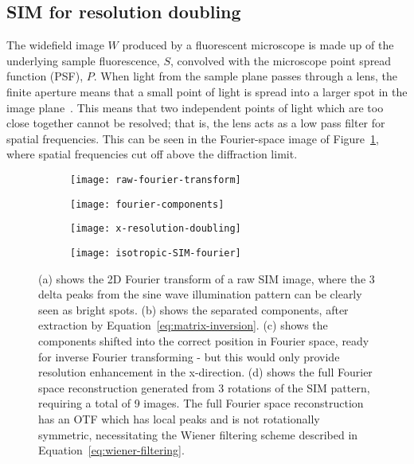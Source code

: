 
\subsection{SIM for resolution doubling} \label{sec:SIM-theory}

The widefield image $W$ produced by a fluorescent microscope is made up of the underlying sample fluorescence, $S$, convolved with the microscope point spread function (PSF), $P$. 
When light from the sample plane passes through a lens, the finite aperture means that a small point of light is spread into a larger spot in the image plane~\cite[\textit{ch. 11}]{hecht2017optics}. 
This means that two independent points of light which are too close together cannot be resolved; that is, the lens acts as a low pass filter for spatial frequencies. 
This can be seen in the Fourier-space image of Figure~\ref{fig:raw-fourier-transform}, where spatial frequencies cut off above the diffraction limit. 

\begin{figure}[p]
\centering
\begin{subfigure}[b]{0.49\textwidth}
	\texttt{[image: raw-fourier-transform]}
	\caption{}\label{fig:raw-fourier-transform}
\end{subfigure}
\hfill
\begin{subfigure}[b]{0.49\textwidth}
	\texttt{[image: fourier-components]}
	\caption{}\label{fig:fourier-components}
\end{subfigure}

\begin{subfigure}[b]{0.49\textwidth}
	\texttt{[image: x-resolution-doubling]}
	\caption{}\label{fig:x-resolution-doubling}
\end{subfigure}
\hfill
\begin{subfigure}[b]{0.49\textwidth}
	\texttt{[image: isotropic-SIM-fourier]}
	\caption{}\label{fig:isotropic-SIM-fourier}
\end{subfigure}
\caption[LAG SIM: Reconstruction of SIM images takes place in Fourier space]{(a) shows the 2D Fourier transform of a raw SIM image, where the 3 delta peaks from the sine wave illumination pattern can be clearly seen as bright spots. (b) shows the separated components, after extraction by Equation~\ref{eq:matrix-inversion}. (c) shows the components shifted into the correct position in Fourier space, ready for inverse Fourier transforming - but this would only provide resolution enhancement in the x-direction. (d) shows the full Fourier space reconstruction generated from 3 rotations of the SIM pattern, requiring a total of 9 images. The full Fourier space reconstruction has an OTF which has local peaks and is not rotationally symmetric, necessitating the Wiener filtering scheme described in Equation~\ref{eq:wiener-filtering}.}
\label{fig:fourier-reconstruction}
\end{figure}

